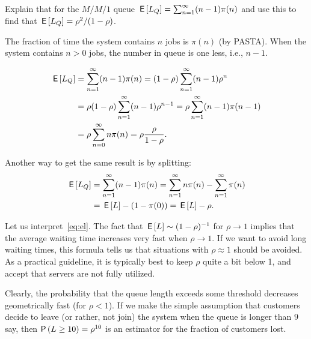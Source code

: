 \begin{extra}
  Explain that for the $M/M/1$ queue $\,\mathsf{E}\left[L_Q\right] = \sum_{n=1}^\infty (n-1)\pi(n)$ and use this to find that $\,\mathsf{E}\left[L_Q\right]=\rho^2/(1-\rho)$.
\begin{solution}
    The fraction of time the system contains $n$ jobs is $\pi(n)$ (by
    PASTA). When the system contains $n>0$ jobs, the number in queue
    is one less, i.e., $n-1$.

    \begin{equation*}
      \begin{split}
\,\mathsf{E}\left[L_Q\right] 
&= \sum_{n=1}^\infty (n-1)\pi(n) 
= (1-\rho)\sum_{n=1}^\infty (n-1) \rho^n\\
&= \rho (1-\rho)\sum_{n=1}^\infty (n-1) \rho^{n-1}
= \rho \sum_{n=1}^\infty (n-1) \pi(n-1)\\
&= \rho \sum_{n=0}^\infty n \pi(n)
= \rho \frac{\rho}{1-\rho}.
      \end{split}
    \end{equation*}

Another way to get the same result is by splitting: 
\begin{equation*}
  \begin{split}
\,\mathsf{E}\left[L_Q\right] 
&= \sum_{n=1}^\infty (n-1)\pi(n) 
=\sum_{n=1}^\infty n\pi(n) -\sum_{n=1}^\infty \pi(n)\\
&= \,\mathsf{E}\left[L\right] - (1-\pi(0)) = \,\mathsf{E}\left[L\right] - \rho.
  \end{split}
\end{equation*}
\end{solution}
\end{extra}


Let us interpret~\cref{eq:el}.
The fact that $\,\mathsf{E}\left[L\right] \sim (1-\rho)^{-1}$ for $\rho\to 1$ implies that the average waiting time increases very fast when $\rho\to1$.
If we want to avoid long waiting times, this formula tells us that situations with $\rho\approx 1$ should be avoided.
As a practical guideline, it is typically best to keep $\rho$ quite a bit below 1, and accept that servers are not fully utilized.

Clearly, the probability that the queue length exceeds some threshold decreases geometrically fast (for $\rho<1$).
If we make the simple assumption that customers decide to leave (or rather, not join) the system when the queue is longer than $9$ say, then $\P{L\geq 10} = \rho^{10}$ is an estimator for the fraction of customers lost.




